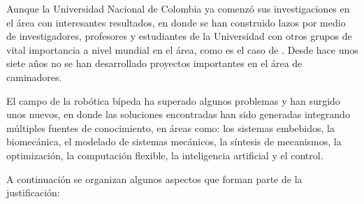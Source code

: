Aunque la Universidad Nacional de Colombia ya comenz\'o sus investigaciones en el \'area con interesantes resultados\cite{M2005,M2005a,Roa2006,Heredia2007}, en donde se han construido lazos por medio de investigadores, profesores y estudiantes de la Universidad con otros grupos de vital importancia a nivel mundial en el \'area, como es el caso de \cite{Englsberger2011,Ott2011,M2013}. Desde hace unos siete a\~nos no se han desarrollado proyectos importantes en el \'area de caminadores.\par
El campo de la rob\'otica b\'ipeda ha superado algunos problemas y han surgido unos nuevos, en donde las soluciones encontradas han sido generadas integrando m\'ultiples fuentes de conocimiento, en \'areas como: los sistemas embebidos\cite{Barker2010,Pan2010,Kimm2012,Wang2011,Amir2013}, la biomec\'anica\cite{Mahmoodi2013,Lim2014,Wu2013,Aoustin2013,Chiang2013,Xiang2010,Hobon2014}, el modelado de sistemas mec\'anicos\cite{Chiang2013}, la s\'intesis de mecanismos\cite{Li2008,Aoustin2013,Wu2013a,Xu2013,Hobon2014}, la optimizaci\'on\cite{Xiang2010,Lim2014,Kherici2014,Mahmoodabadi2014}, la computaci\'on flexible\cite{Wang2013,Kherici2014,Mahmoodabadi2014}, la inteligencia artificial\cite{Treesatayapun2014,Yuan2014,Wu2014,Wang2013} y el control\cite{Dou2013,Treesatayapun2014,Yuan2014,Wu2014}.\par
A continuaci\'on se organizan algunos aspectos que forman parte de la justificaci\'on:
